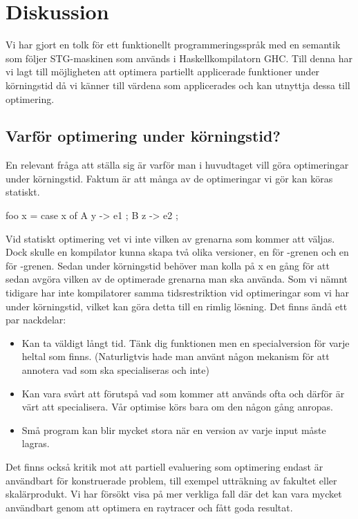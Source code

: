 \documentclass[Rapport]{subfiles}
\begin{document}
\section{Diskussion}
    
Vi har gjort en tolk för ett funktionellt programmeringsspråk
med en semantik som följer STG-maskinen som används i Haskellkompilatorn GHC.
Till denna har vi lagt till möjligheten att optimera partiellt applicerade funktioner under körningstid
då vi känner till värdena som applicerades och kan utnyttja dessa till optimering.

\subsection{Varför optimering under körningstid?}

En relevant fråga att ställa sig är varför man i huvudtaget vill göra optimeringar under körningstid. Faktum är att många av de optimeringar vi gör kan köras statiskt.

\begin{codeEx}

foo x = case x of
        { A y  -> e1
        ; B z  -> e2
        };

\end{codeEx}

Vid statiskt optimering vet vi inte vilken av grenarna som kommer att väljas. Dock skulle en kompilator kunna skapa två olika versioner, en för -grenen och en för 
-grenen. Sedan under körningstid behöver man kolla på x en gång för att sedan avgöra vilken av de optimerade grenarna man ska använda.
Som vi nämnt tidigare har inte kompilatorer samma tidsrestriktion vid optimeringar som vi har under körningstid, vilket kan göra detta till en rimlig lösning. Det finns ändå ett par nackdelar:
\begin{itemize}
    \item Kan ta väldigt långt tid. Tänk dig  funktionen men en specialversion för varje heltal som finns. (Naturligtvis hade man använt någon mekanism för att annotera vad som ska specialiseras och inte)
    \item Kan vara svårt att förutspå vad som kommer att används ofta och därför är värt att specialisera. Vår optimise körs bara om den någon gång anropas.
    \item Små program kan blir mycket stora när en version av varje input måste lagras.
\end{itemize}


Det finns också kritik mot att partiell evaluering som optimering endast är användbart för konstruerade problem, till exempel utträkning av fakultet eller skalärprodukt. Vi har försökt visa på mer verkliga fall där det kan vara mycket användbart genom att optimera en raytracer och fått goda resultat. 
\end{document}
